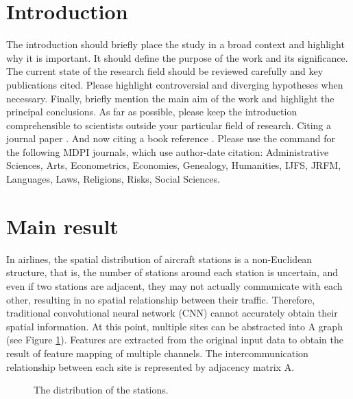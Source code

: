 \documentclass[journal,article,submit,moreauthors,pdftex]{Definitions/mdpi}
\begin{document}
\section{Introduction}
The introduction should briefly place the study in a broad context and highlight why it is important. It should define the purpose of the work and its significance. The current state of the research field should be reviewed carefully and key publications cited. Please highlight controversial and diverging hypotheses when necessary. Finally, briefly mention the main aim of the work and highlight the principal conclusions. As far as possible, please keep the introduction comprehensible to scientists outside your particular field of research. Citing a journal paper \cite{ref-journal}. And now citing a book reference \cite{ref-book}. Please use the command \citep{ref-journal} for the following MDPI journals, which use author-date citation: Administrative Sciences, Arts, Econometrics, Economies, Genealogy, Humanities, IJFS, JRFM, Languages, Laws, Religions, Risks, Social Sciences.
\section{Main result}
In airlines, the spatial distribution of aircraft stations is a non-Euclidean structure, that is, the number of stations around each station is uncertain, and even if two stations are adjacent, they may not actually communicate with each other, resulting in no spatial relationship between their traffic. Therefore, traditional convolutional neural network (CNN) cannot accurately obtain their spatial information. At this point, multiple sites can be abstracted into A graph (see Figure \ref{fig:stations}). Features are extracted from the original input data to obtain the result of feature mapping of multiple channels. The intercommunication relationship between each site is represented by adjacency matrix A.
\begin{figure}[htp]
    \centering
    \caption{The distribution of the stations.}
    \label{fig:stations}
\end{figure}
\end{document}
